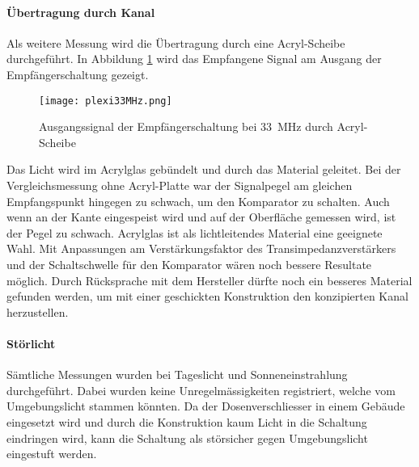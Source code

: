 \newpage
\paragraph{Übertragung durch Kanal}
Als weitere Messung wird die Übertragung durch eine Acryl-Scheibe durchgeführt. In Abbildung \ref{fig:plexi33} wird das Empfangene Signal am Ausgang der Empfängerschaltung gezeigt.
\begin{figure}[h!]
	\centering
	\texttt{[image: plexi33MHz.png]}
	\caption{Ausgangssignal der Empfängerschaltung bei \SI{33}{MHz} durch Acryl-Scheibe}\label{fig:plexi33}
\end{figure}
Das Licht wird im Acrylglas gebündelt und durch das Material geleitet. Bei der Vergleichsmessung ohne Acryl-Platte war der Signalpegel am gleichen Empfangspunkt hingegen zu schwach, um den Komparator zu schalten. Auch wenn an der Kante eingespeist wird und auf der Oberfläche gemessen wird, ist der Pegel zu schwach. Acrylglas ist als lichtleitendes Material eine geeignete Wahl. Mit Anpassungen am Verstärkungsfaktor des Transimpedanzverstärkers und der Schaltschwelle für den Komparator wären noch bessere Resultate möglich. Durch Rücksprache mit dem Hersteller dürfte noch ein besseres Material gefunden werden, um mit einer geschickten Konstruktion den konzipierten Kanal herzustellen.

\paragraph{Störlicht}
Sämtliche Messungen wurden bei Tageslicht und Sonneneinstrahlung durchgeführt. Dabei wurden keine Unregelmässigkeiten registriert, welche vom Umgebungslicht stammen könnten. Da der Dosenverschliesser in einem Gebäude eingesetzt wird und durch die Konstruktion kaum Licht in die Schaltung eindringen wird, kann die Schaltung als störsicher gegen Umgebungslicht eingestuft werden.